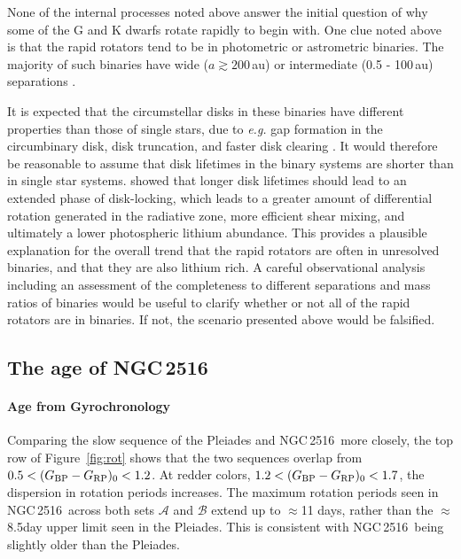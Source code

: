 \documentclass[12pt,twocolumn,tighten]{aastex63}
\newcommand{\cn}{NGC\,2516} %
\newcommand{\bpmrpo}{(G_{\rm BP}-G_{\rm RP})_0}
\begin{document}
None of the internal processes noted above answer the initial
question of why some of the G and K dwarfs rotate rapidly to begin
with.  One clue noted above is that the rapid rotators tend to be in
photometric or astrometric binaries.  The majority of such binaries
have wide ($a\gtrsim200$\,au) or intermediate (0.5 - 100\,au)
separations \citep{raghavan_survey_2010}.

It is expected that the circumstellar disks in these binaries have
different properties than those of single stars, due to {\it e.g.} gap
formation in the circumbinary disk, disk truncation, and faster disk
clearing \citep{artymowicz_dynamics_1994,moe_impact_2020}.  It would
therefore be reasonable to assume that disk lifetimes in the binary
systems are shorter than in single star systems.
\citet{eggenberger_impact_2012} showed that longer disk lifetimes
should lead to an extended phase of disk-locking, which leads to a
greater amount of differential rotation generated in the radiative
zone, more efficient shear mixing, and ultimately a lower photospheric
lithium abundance.  This provides a plausible explanation for the
overall trend that the rapid rotators are often in unresolved
binaries, and that they are also lithium rich.  A careful
observational analysis including an assessment of the completeness to
different separations and mass ratios of binaries would be useful to
clarify whether or not all of the rapid rotators are in binaries.  If
not, the scenario presented above would be falsified.


\subsection{The age of NGC\,2516}
\label{disc:absage}


\paragraph{Age from Gyrochronology}
Comparing the slow sequence of the Pleiades and \cn\ more closely, the
top row of Figure~\ref{fig:rot} shows that the two sequences overlap
from $0.5<\bpmrpo<1.2$.  At redder colors, $1.2<\bpmrpo<1.7$, the
dispersion in rotation periods increases.  The maximum rotation
periods seen in \cn\ across both sets $\mathcal{A}$ and $\mathcal{B}$
extend up to $\approx$11 days, rather than the $\approx$8.5day upper
limit seen in the Pleiades.  This is consistent with \cn\ being
slightly older than the Pleiades.
\end{document}
